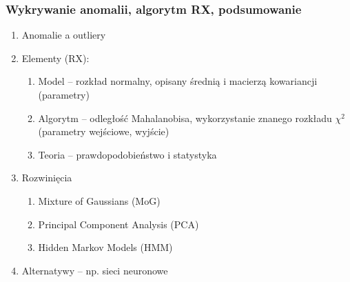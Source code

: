 \documentclass[11pt, xcolor={dvipsnames,svgnames},aspectratio=169]{beamer}
\theoremstyle{plain}
\theoremstyle{plain}
\begin{document}
\begin{frame}
	\frametitle{Wykrywanie anomalii, algorytm RX, podsumowanie}
	\begin{enumerate}
		\item<1-> Anomalie a outliery
		\item<2-> Elementy (RX):
			\begin{enumerate}
				\item Model -- rozkład normalny, opisany średnią i macierzą kowariancji (parametry)
				\item Algorytm -- odległość Mahalanobisa, wykorzystanie znanego rozkładu $\chi^2$ (parametry wejściowe, wyjście)
				\item Teoria -- prawdopodobieństwo i statystyka
			\end{enumerate}
		\item<3-> Rozwinięcia
			\begin{enumerate}
				\item Mixture of Gaussians (MoG)
				\item Principal Component Analysis (PCA) 
				\item Hidden Markov Models (HMM)
			\end{enumerate}
		\item<4-> Alternatywy -- np. sieci neuronowe
	\end{enumerate}
\end{frame}







\end{document}

